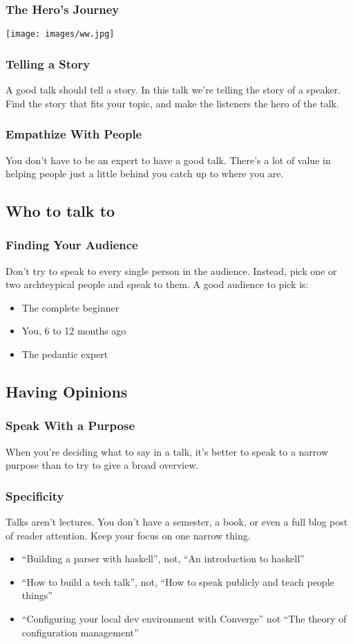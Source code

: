 \documentclass{beamer}
\begin{document}
\begin{frame}
  \frametitle{The Hero's Journey}
  \texttt{[image: images/ww.jpg]}
\end{frame}

\begin{frame}
  \frametitle{Telling a Story}
  A good talk should tell a story.  In this talk we're telling the
  story of a speaker.  Find the story that fits your topic, and make
  the listeners the hero of the talk.
\end{frame}

\begin{frame}
  \frametitle{Empathize With People}
  You don't have to be an expert to have a good talk.  There's a lot
  of value in helping people just a little behind you catch up to
  where you are.
\end{frame}

\subsection{Who to talk to}

\begin{frame}
  \frametitle{Finding Your Audience}
  Don't try to speak to every single person in the audience.  Instead,
  pick one or two archteypical people and speak to them.  A good
  audience to pick is:
  \begin{itemize}
  \item The complete beginner
  \item You, 6 to 12 months ago
  \item The pedantic expert
  \end{itemize}
\end{frame}

\subsection{Having Opinions}

\begin{frame}
  \frametitle{Speak With a Purpose}
  When you're deciding what to say in a talk, it's better to speak to
  a narrow purpose than to try to give a broad overview.
\end{frame}

\begin{frame}
  \frametitle{Specificity}
  Talks aren't lectures.  You don't have a semester, a book, or even a
  full blog post of reader attention.  Keep your focus on one narrow
  thing.
  \begin{itemize}
  \item ``Building a parser with haskell'', not, ``An introduction to haskell''
  \item ``How to build a tech talk'', not, ``How to speak publicly and teach people things''
  \item ``Configuring your local dev environment with Converge'' not ``The theory of configuration management''
  \end{itemize}
\end{frame}
\end{document}
